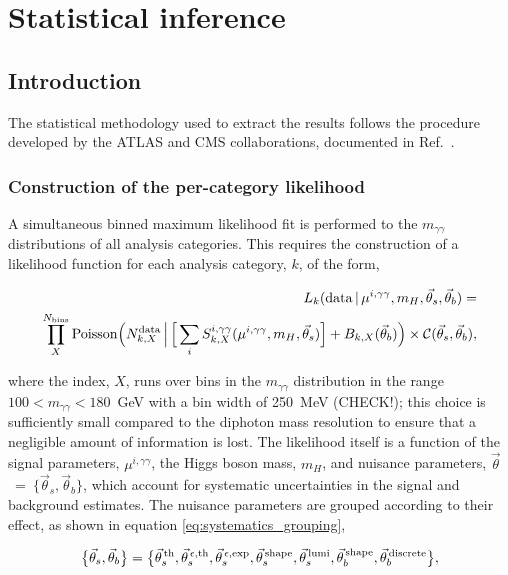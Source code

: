 \chapter{Statistical inference}
\label{chap:hgg_stats}

\section{Introduction}
The statistical methodology used to extract the results follows the procedure developed by the ATLAS and CMS collaborations, documented in Ref.~\cite{Khachatryan:2014jba}. 

\subsection{Construction of the per-category likelihood}\label{sec:category_likelihood}
A simultaneous binned maximum likelihood fit is performed to the $m_{\gamma\gamma}$ distributions of all analysis categories. This requires the construction of a likelihood function for each analysis category, $k$, of the form,

\begin{equation}\label{eq:category_likelihood}
\begin{split}
    L_k({\rm{data}}\,|\,\mu^{i,\gamma\gamma},m_H,\vec{\theta}_s,\vec{\theta}_b) = \\
    \prod^{N_{\rm{bins}}}_{X} {\rm{Poisson}} \Big( N_{k,X}^{\rm{data}} \, \Big| \, \Big[ \sum_{i} S_{k,X}^{i,\gamma\gamma}(\mu^{i,\gamma\gamma},m_H,\vec{\theta}_s)\Big] + B_{k,X}(\vec{\theta}_b) \Big) \times \mathcal{C}(\vec{\theta}_s,\vec{\theta}_b),        
\end{split}
\end{equation}

\noindent
where the index, $X$, runs over bins in the $m_{\gamma\gamma}$ distribution in the range $100<m_{\gamma\gamma}<180$~GeV with a bin width of 250~MeV (CHECK!); this choice is sufficiently small compared to the diphoton mass resolution to ensure that a negligible amount of information is lost. The likelihood itself is a function of the signal parameters, $\mu^{i,\gamma\gamma}$, the Higgs boson mass, $m_H$, and nuisance parameters, $\vec{\theta}$~=~$\{\vec{\theta}_s,\vec{\theta}_b\}$, which account for systematic uncertainties in the signal and background estimates. The nuisance parameters are grouped according to their effect, as shown in equation \ref{eq:systematics_grouping},

\begin{equation}\label{eq:systematics_grouping}
    \big\{\vec{\theta}_s,\vec{\theta}_b\big\} = \big\{ \vec{\theta}^{\,\rm{th}}_{s}, \vec{\theta}^{\,\epsilon,{\rm{th}}}_{s}, \vec{\theta}^{\,\epsilon,{\rm{exp}}}_{s}, \vec{\theta}^{\,\rm{shape}}_{s}, \vec{\theta}^{\,\rm{lumi}}_{s}, \vec{\theta}^{\,\rm{shape}}_{b}, \vec{\theta}^{\,\rm{discrete}}_{b}  \big\},
\end{equation}

